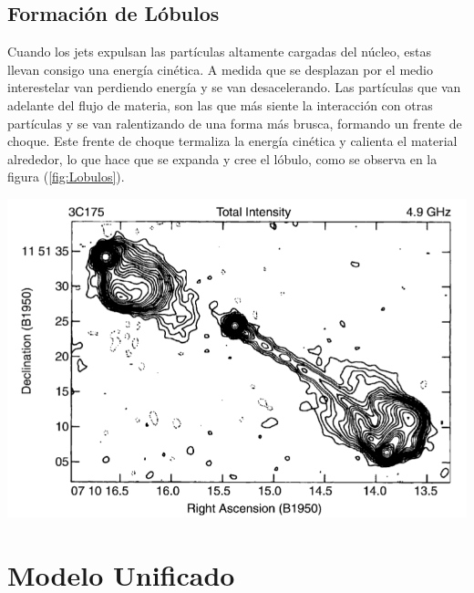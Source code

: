 	\subsection{Formación de Lóbulos}
	\label{subsec:Formation_lobules}

Cuando los jets expulsan las partículas altamente cargadas del núcleo, estas llevan consigo una energía cinética. A medida que se desplazan por el medio interestelar van perdiendo energía y se van desacelerando. Las partículas que van adelante del flujo de materia, son las que más siente la interacción con otras partículas y se van ralentizando de una forma más brusca, formando un frente de choque. Este frente de choque termaliza la energía cinética y calienta el material alrededor, lo que hace que se expanda y cree el lóbulo,
como se observa en la figura (\ref{fig:Lobulos}).

\begin{center}
\includegraphics[scale=.3]{./figures/3_AGNs/Lobulos_y_Jets.png}
\label{fig:Lobulos}
\end{center}

\section{Modelo Unificado}
\label{sec:Unified_models}

